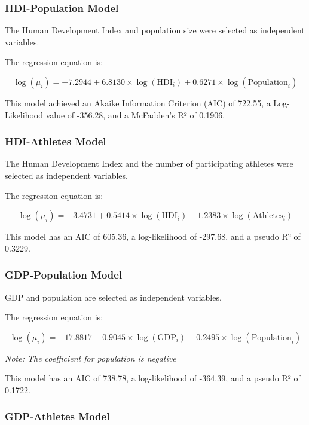 \documentclass[11pt,twoside]{article}
\numberwithin{Theorem}{section}
\numberwithin{Definition}{section}
\numberwithin{Lemma}{section}
\numberwithin{Algorithm}{section}
\numberwithin{equation}{section}
\begin{document}
\subsubsection{HDI-Population Model}

The Human Development Index and population size were selected as independent variables.

The regression equation is:

\begin{equation}
\log(\mu_i) = -7.2944 + 6.8130 \times \log(\text{HDI}_i) + 0.6271 \times \log(\text{Population}_i)
\end{equation}

This model achieved an Akaike Information Criterion (AIC) of 722.55, a Log-Likelihood value of -356.28, and a McFadden's R² of 0.1906.

\subsubsection{HDI-Athletes Model}

The Human Development Index and the number of participating athletes were selected as independent variables.

The regression equation is:

\begin{equation}
\log(\mu_i) = -3.4731 + 0.5414 \times \log(\text{HDI}_i) + 1.2383 \times \log(\text{Athletes}_i)
\end{equation}

This model has an AIC of 605.36, a log-likelihood of -297.68, and a pseudo R² of 0.3229.

\subsubsection{GDP-Population Model}

GDP and population are selected as independent variables.

The regression equation is:

\begin{equation}
\log(\mu_i) = -17.8817 + 0.9045 \times \log(\text{GDP}_i) - 0.2495 \times \log(\text{Population}_i)
\end{equation}

\emph{Note: The coefficient for population is negative}

This model has an AIC of 738.78, a log-likelihood of -364.39, and a pseudo R² of 0.1722.

\subsubsection{GDP-Athletes Model}
\end{document}
